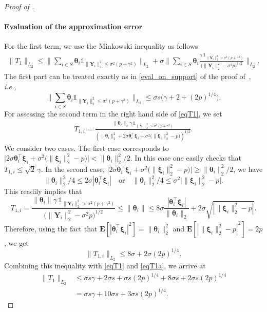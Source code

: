 \documentclass[sts,preprint,reqno,a4paper]{imsart}
\def\s{\sigma}
\def\ie{\textit{i.e., }}
\def\bxi{\boldsymbol\xi}
\def\bt{\boldsymbol\theta}
\def\bY{\boldsymbol Y\!}
\def\fcar{\mathds{1}}
\def\esp{\mathbf E}
\theoremstyle{plain}
\theoremstyle{remark}
\theoremstyle{definition}
\begin{document}
\begin{proof}[Proof of ]
\paragraph{Evaluation of the approximation error}
For the first term, we use the Minkowski inequality as follows
	\begin{align}\label{eqT1}
	\|T_1\|_{L_2}\le \Big\|\sum_{i\in S} \bt_i \fcar_{\|\bY_i\|_2^2\le\sigma^2 (p+\gamma^2)
	}\Big\|_{L_2} + \sigma\Big\|\sum_{i\in S}  \bt_i \frac{\gamma\,\fcar_{\|\bY_i\|_2^2>\sigma^2 
	(p+\gamma^2)}}{\big(\|\bY_i\|^2_2-\sigma^2p\big)^{1/2}}\Big\|_{L_2}.
	\end{align}
	The first part can be treated exactly as in \eqref{eval_on_support} of the proof 
	of~, \ie
	\begin{equation}\label{eqT1a}
		\Big\|\sum_{i\in S} \bt_i \fcar_{\|\bY_i\|_2^2\le\sigma^2 (p+\gamma^2)
	}\Big\|_{L_2} \le \sigma s \big(\gamma+2 +  (2p)^{1/4}\big).
	\end{equation}
	For assessing the second term in the right hand side of \eqref{eqT1}, 
	we set 
	\begin{align}
	T_{1,i} = \frac{\|\bt_i\|_2\gamma\,\fcar_{\|\bY_i\|_2^2>\sigma^2 (p+\gamma^2)}}
	{(\|\bt_i\|^2_2+2\sigma\bt_i^\top\bxi_i+\sigma^2\big(\|\bxi_i\|_2^2-p\big))^{1/2}} .
	\end{align}
	We consider two cases. The first case corresponds to 
	$\big|2\sigma\bt_i^\top\bxi_i+\sigma^2\big(\|\bxi_i\|_2^2-p\big)\big|<\|\bt_i\|_2^2/2$. 
	In this case one easily checks that  $T_{1,i}\le \sqrt{2}\,\gamma$. In the second case, 
	$\big|2\sigma\bt_i^\top\bxi_i+\sigma^2\big(\|\bxi_i\|_2^2-p\big)\big|\ge\|\bt_i\|_2^2/2$, 
	we have 
	\begin{equation}
		\|\bt_i\|_2^2/4 \le 2\s|\bt_i^\top\bxi_i| \quad \text{or} \quad \|\bt_i\|_2^2/4 \le 
		\sigma^2\big|\|\bxi_i\|_2^2-p\big|.
	\end{equation}
	This readily implies that 
	\begin{equation}
		T_{1,i}= \frac{\|\bt_i\|\gamma\,\fcar_{\|\bY_i\|_2^2>\sigma^2 (p+\gamma^2)}}
	  {\big(\|\bY_i\|^2_2-\sigma^2p\big)^{1/2}}\le \|\bt_i\| \le 8\sigma 
		\frac{|\bt_i^\top\bxi_i|}{\|\bt_i\|_2}+ 2\sigma\sqrt{|\|\bxi_i\|_2^2-p|}.
	\end{equation}
	Therefore, using the fact that $\esp[|\bt_i^\top\bxi_i|^2] = \|\bt_i\|_2^2$ 
	and $\esp[|\|\bxi_i\|_2^2-p|^2] = 2p$, we get	
	\begin{equation}
		\|T_{1,i}\|_{L_2} \le 8\sigma + 2\sigma (2p)^{1/4}.
	\end{equation}
	Combining this inequality with \eqref{eqT1} and \eqref{eqT1a}, we arrive at
	\begin{align}
		\|T_1\|_{L_2} &\le \sigma 
		s\gamma+2\sigma s + \sigma s(2p)^{1/4} + 8\sigma s+ 2\sigma s(2p)^{1/4}\\
		&= \sigma s\gamma+10\sigma s + 3\sigma s(2p)^{1/4}.\label{eqT1c}
	\end{align}
	

\end{proof}
\end{document}
